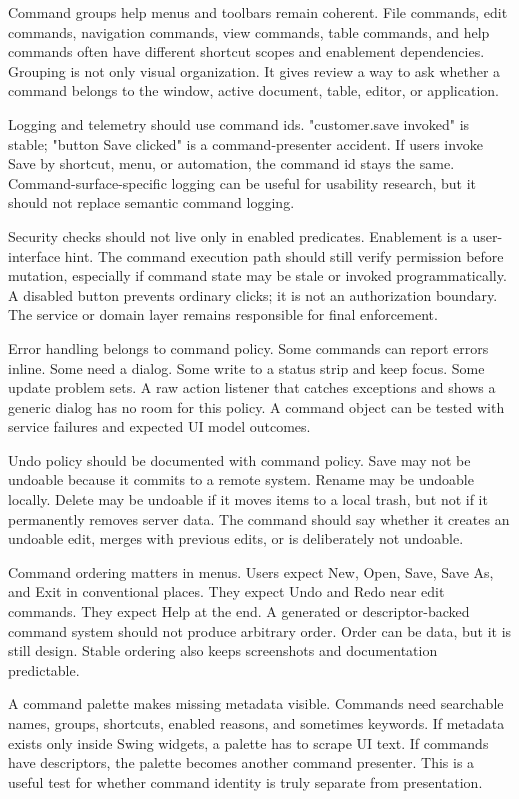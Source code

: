 Command groups help menus and toolbars remain coherent. File commands, edit commands, navigation commands, view commands, table commands, and help commands often have different shortcut scopes and enablement dependencies. Grouping is not only visual organization. It gives review a way to ask whether a command belongs to the window, active document, table, editor, or application.

Logging and telemetry should use command ids. "customer.save invoked" is stable; "button Save clicked" is a command-presenter accident. If users invoke Save by shortcut, menu, or automation, the command id stays the same. Command-surface-specific logging can be useful for usability research, but it should not replace semantic command logging.

Security checks should not live only in enabled predicates. Enablement is a user-interface hint. The command execution path should still verify permission before mutation, especially if command state may be stale or invoked programmatically. A disabled button prevents ordinary clicks; it is not an authorization boundary. The service or domain layer remains responsible for final enforcement.

Error handling belongs to command policy. Some commands can report errors inline. Some need a dialog. Some write to a status strip and keep focus. Some update problem sets. A raw action listener that catches exceptions and shows a generic dialog has no room for this policy. A command object can be tested with service failures and expected UI model outcomes.

Undo policy should be documented with command policy. Save may not be undoable because it commits to a remote system. Rename may be undoable locally. Delete may be undoable if it moves items to a local trash, but not if it permanently removes server data. The command should say whether it creates an undoable edit, merges with previous edits, or is deliberately not undoable.

Command ordering matters in menus. Users expect New, Open, Save, Save As, and Exit in conventional places. They expect Undo and Redo near edit commands. They expect Help at the end. A generated or descriptor-backed command system should not produce arbitrary order. Order can be data, but it is still design. Stable ordering also keeps screenshots and documentation predictable.

A command palette makes missing metadata visible. Commands need searchable names, groups, shortcuts, enabled reasons, and sometimes keywords. If metadata exists only inside Swing widgets, a palette has to scrape UI text. If commands have descriptors, the palette becomes another command presenter. This is a useful test for whether command identity is truly separate from presentation.

